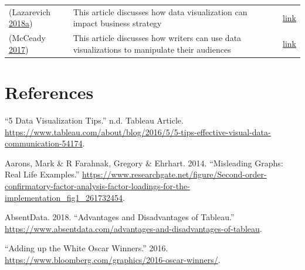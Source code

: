 \documentclass[]{book}
\begin{document}
\begin{longtable}[]{@{}lll@{}}
\begin{minipage}[t]{0.15\columnwidth}
(Lazarevich \protect\hyperlink{ref-strategy_impact}{2018}\protect\hyperlink{ref-strategy_impact}{a})\strut
\end{minipage} & \begin{minipage}[t]{0.28\columnwidth}\raggedright
This article discusses how data visualization can impact business strategy\strut
\end{minipage} & \begin{minipage}[t]{0.48\columnwidth}\raggedright
\href{https://www.iotforall.com/data-visualization-strategy-for-business/}{link}\strut
\end{minipage}\tabularnewline
\begin{minipage}[t]{0.15\columnwidth}\raggedright
(McCeady \protect\hyperlink{ref-writers_manipulate}{2017})\strut
\end{minipage} & \begin{minipage}[t]{0.28\columnwidth}\raggedright
This article discusses how writers can use data visualizations to manipulate their audiences\strut
\end{minipage} & \begin{minipage}[t]{0.48\columnwidth}\raggedright
\href{https://venngage.com/blog/misleading-graphs/}{link}\strut
\end{minipage}\tabularnewline
\bottomrule
\end{longtable}

\hypertarget{references-1}{%
\chapter*{References}\label{references-1}}

\hypertarget{refs}{}
\leavevmode\hypertarget{ref-DataVizTips}{}%
``5 Data Visualization Tips.'' n.d. Tableau Article. \url{https://www.tableau.com/about/blog/2016/5/5-tips-effective-visual-data-communication-54174}.

\leavevmode\hypertarget{ref-aarons_2014}{}%
Aarons, Mark \& R Farahnak, Gregory \& Ehrhart. 2014. ``Misleading Graphs: Real Life Examples.'' \url{https://www.researchgate.net/figure/Second-order-confirmatory-factor-analysis-factor-loadings-for-the-implementation_fig1_261732454}.

\leavevmode\hypertarget{ref-tableau_interactive_viz}{}%
AbsentData. 2018. ``Advantages and Disadvantages of Tableau.'' \url{https://www.absentdata.com/advantages-and-disadvantages-of-tableau}.

\leavevmode\hypertarget{ref-adding_oscars}{}%
``Adding up the White Oscar Winners.'' 2016. \url{https://www.bloomberg.com/graphics/2016-oscar-winners/}.
\end{document}
